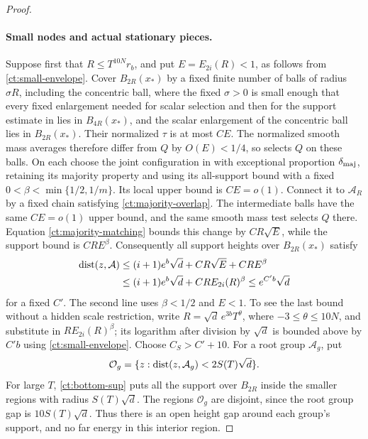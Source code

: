\begin{proof}
\paragraph{Small nodes and actual stationary pieces.}
Suppose first that $R\le T^{10N}r_b$, and put $E=E_{2i}(R)<1$,
as follows from \eqref{ct:small-envelope}.
Cover $B_{2R}(x_*)$ by a fixed finite number of balls of radius
$\sigma R$, including the concentric ball, where the fixed $\sigma>0$
is small enough that every
fixed enlargement needed for scalar selection and then for the support
estimate in  lies in $B_{4R}(x_*)$, and the scalar
enlargement of the concentric ball lies in $B_{2R}(x_*)$.
Their normalized $\tau$ is at most $CE$.
The normalized smooth mass averages therefore differ from $Q$ by
$O(E)<1/4$, so  selects $Q$ on these balls.
On each choose the joint configuration in  with
exceptional proportion $\delta_{\rm maj}$, retaining its majority property
and using its all-support bound with a fixed
$0<\beta<\min\{1/2,1/m\}$. Its local upper bound is $CE=o(1)$.
Connect it to $\mathcal A_R$ by a fixed chain satisfying
\eqref{ct:majority-overlap}. The intermediate balls have the same
$CE=o(1)$ upper bound, and the same smooth mass test selects $Q$ there.
Equation \eqref{ct:majority-matching}
bounds this change by $CR\sqrt E$, while the support bound is $CRE^\beta$.
Consequently all support heights over $B_{2R}(x_*)$ satisfy
\begin{equation}\label{ct:bottom-sup}
 \begin{split}
 \operatorname{dist}(z,\mathcal A)
 &\le (i+1)e^b\sqrt d+CR\sqrt E+CRE^\beta\\
 &\le (i+1)e^b\sqrt d+C R E_{2i}(R)^\beta
 \le e^{C'b}\sqrt d
 \end{split}
\end{equation}
for a fixed $C'$. The second line uses $\beta<1/2$ and $E<1$.
To see the last bound without a
hidden scale restriction, write $R=\sqrt d\,e^{3b}T^\theta$, where
$-3\le\theta\le10N$, and substitute in $RE_{2i}(R)^\beta$;
its logarithm after division by $\sqrt d$ is bounded above by $C'b$
using \eqref{ct:small-envelope}.  Choose $C_S>C'+10$.
For a root group $\mathcal A_g$, put
\[
 \mathcal O_g=\{z:\operatorname{dist}(z,\mathcal A_g)<2S(T)\sqrt d\}.
\]
For large $T$, \eqref{ct:bottom-sup} puts all the support over $B_{2R}$
inside the smaller regions with radius $S(T)\sqrt d$. The regions
$\mathcal O_g$ are disjoint, since the root group gap is
$10S(T)\sqrt d$. Thus there is an open height gap around each group's
support, and no far energy in this interior region.


\end{proof}
